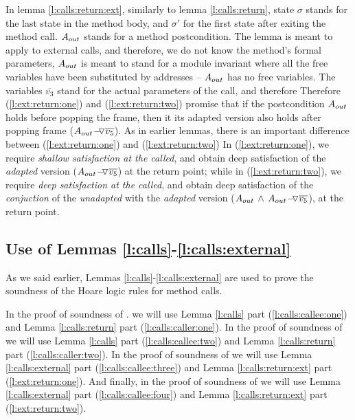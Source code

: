 In lemma  \ref{l:calls:return:ext}, similarly to  lemma \ref{l:calls:return},  
 state  $\sigma$ stands for the last state in the method body, and $\sigma'$ for the first state after exiting  the method call.
$A_{out}$ stands for a method postcondition.
The lemma is meant to apply to external calls, and therefore, we do not know the method's formal parameters, 
$A_{out}$ is meant to stand for a module invariant where all the free variables have been substituted by addresses --
\ie $A_{out}$ has no free variables.
The variables $\overline {v_3}$ stand for the actual parameters of the call, and therefore 
Therefore    (\ref{l:ext:return:one})  and  (\ref{l:ext:return:two})
promise that if the postcondition $A_{out}$ holds before popping the frame, then it its adapted version 
also holds after popping frame (${ A_{out} \!-\!\!\!\,\!{\triangledown} \overline {v_5}}$).
 As in earlier lemmas, there is an important difference between   (\ref{l:ext:return:one})  and  (\ref{l:ext:return:two})
In  (\ref{l:ext:return:one}),  we require \emph{shallow satisfaction at the called}, 
and obtain   deep satisfaction of the \emph{adapted} version (${ A_{out} \!-\!\!\!\,\!{\triangledown} \overline {v_5}}$) at the return point;
while in (\ref{l:ext:return:two}), we  require \emph{deep satisfaction at the called}, 
and obtain deep satisfaction of the   \emph{conjuction}  of the \emph{unadapted} with the \emph{adapted} version (${A_{out} \, \wedge\, { A_{out} \!-\!\!\!\,\!{\triangledown} \overline {v_5}}}$),
at the return point.

\subsection{\textbf{Use of Lemmas \ref{l:calls}-\ref{l:calls:external} }}

As we said earlier, Lemmas \ref{l:calls}-\ref{l:calls:external} are used to prove the soundness of the Hoare logic rules for method calls.

In the proof of soundness of {}. we will use Lemma \ref{l:calls} part (\ref{l:calls:callee:one}) and Lemma \ref{l:calls:return} part (\ref{l:calls:caller:one}).  
In the proof of soundness of {} we will use  Lemma \ref{l:calls} part (\ref{l:calls:callee:two}) and Lemma \ref{l:calls:return} part (\ref{l:calls:caller:two}).
In the proof of soundness of {} we will use  Lemma \ref{l:calls:external} part (\ref{l:calls:callee:three}) and Lemma \ref{l:calls:return:ext} part (\ref{l:ext:return:one}).
And finally, in the proof of soundness of {} we will use  Lemma \ref{l:calls:external} part (\ref{l:calls:callee:four}) and Lemma \ref{l:calls:return:ext} part (\ref{l:ext:return:two}).



 



 
 
  